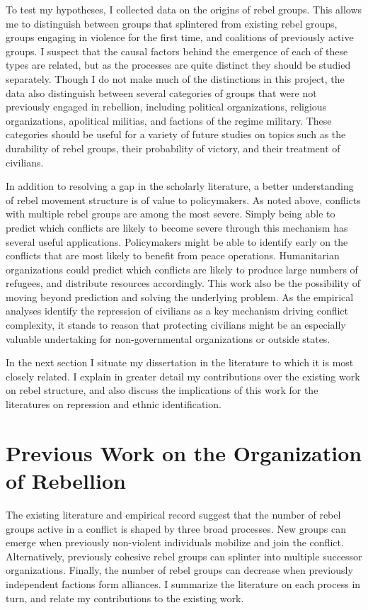 \documentclass[12pt,]{book}
\theoremstyle{definition}
\theoremstyle{definition}
\theoremstyle{remark}
\begin{document}
To test my hypotheses, I collected data on the origins of rebel groups.
This allows me to distinguish between groups that splintered from
existing rebel groups, groups engaging in violence for the first time,
and coalitions of previously active groups. I suspect that the causal
factors behind the emergence of each of these types are related, but as
the processes are quite distinct they should be studied separately.
Though I do not make much of the distinctions in this project, the data
also distinguish between several categories of groups that were not
previously engaged in rebellion, including political organizations,
religious organizations, apolitical militias, and factions of the regime
military. These categories should be useful for a variety of future
studies on topics such as the durability of rebel groups, their
probability of victory, and their treatment of civilians.

In addition to resolving a gap in the scholarly literature, a better
understanding of rebel movement structure is of value to policymakers.
As noted above, conflicts with multiple rebel groups are among the most
severe. Simply being able to predict which conflicts are likely to
become severe through this mechanism has several useful applications.
Policymakers might be able to identify early on the conflicts that are
most likely to benefit from peace operations. Humanitarian organizations
could predict which conflicts are likely to produce large numbers of
refugees, and distribute resources accordingly. This work also be the
possibility of moving beyond prediction and solving the underlying
problem. As the empirical analyses identify the repression of civilians
as a key mechanism driving conflict complexity, it stands to reason that
protecting civilians might be an especially valuable undertaking for
non-governmental organizations or outside states.

In the next section I situate my dissertation in the literature to which
it is most closely related. I explain in greater detail my contributions
over the existing work on rebel structure, and also discuss the
implications of this work for the literatures on repression and ethnic
identification.

\section{Previous Work on the Organization of
Rebellion}\label{previous-work-on-the-organization-of-rebellion}

The existing literature and empirical record suggest that the number of
rebel groups active in a conflict is shaped by three broad processes.
New groups can emerge when previously non-violent individuals mobilize
and join the conflict. Alternatively, previously cohesive rebel groups
can splinter into multiple successor organizations. Finally, the number
of rebel groups can decrease when previously independent factions form
alliances. I summarize the literature on each process in turn, and
relate my contributions to the existing work.
\end{document}
